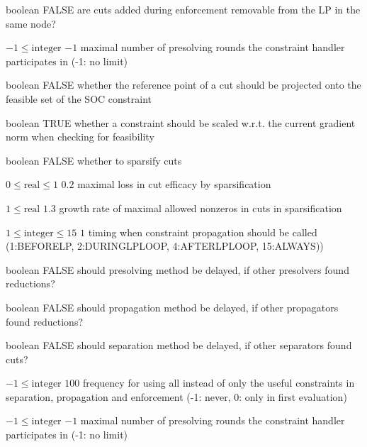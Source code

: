 %
{boolean}%
{FALSE}%
{are cuts added during enforcement removable from the LP in the same node?}%
{}

%
{$-1\leq\textrm{integer}$}%
{$-1$}%
{maximal number of presolving rounds the constraint handler participates in (-1: no limit)}%
{}

%
{boolean}%
{FALSE}%
{whether the reference point of a cut should be projected onto the feasible set of the SOC constraint}%
{}

%
{boolean}%
{TRUE}%
{whether a constraint should be scaled w.r.t. the current gradient norm when checking for feasibility}%
{}

%
{boolean}%
{FALSE}%
{whether to sparsify cuts}%
{}

%
{$0\leq\textrm{real}\leq1$}%
{$0.2$}%
{maximal loss in cut efficacy by sparsification}%
{}

%
{$1\leq\textrm{real}$}%
{$1.3$}%
{growth rate of maximal allowed nonzeros in cuts in sparsification}%
{}

%
{$1\leq\textrm{integer}\leq15$}%
{$1$}%
{timing when constraint propagation should be called (1:BEFORELP, 2:DURINGLPLOOP, 4:AFTERLPLOOP, 15:ALWAYS))}%
{}

%
{boolean}%
{FALSE}%
{should presolving method be delayed, if other presolvers found reductions?}%
{}

%
{boolean}%
{FALSE}%
{should propagation method be delayed, if other propagators found reductions?}%
{}

%
{boolean}%
{FALSE}%
{should separation method be delayed, if other separators found cuts?}%
{}

%
{$-1\leq\textrm{integer}$}%
{$100$}%
{frequency for using all instead of only the useful constraints in separation, propagation and enforcement (-1: never, 0: only in first evaluation)}%
{}

%
{$-1\leq\textrm{integer}$}%
{$-1$}%
{maximal number of presolving rounds the constraint handler participates in (-1: no limit)}%
{}

